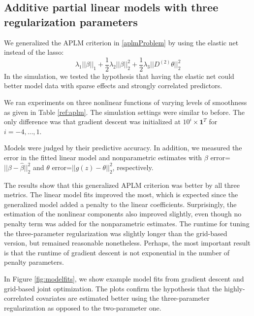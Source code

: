 \documentclass[10pt,letterpaper]{article}
\begin{document}
\subsection{Additive partial linear models with three regularization parameters}
We generalized the APLM criterion in \eqref{aplmProblem} by using the elastic net instead of the lasso:
\begin{equation}
\lambda_1 \lvert\lvert \beta \rvert \rvert_1
+ \frac{1}{2} \lambda_2 \lvert\lvert \beta \rvert \rvert_2^2
+ \frac{1}{2} \lambda_3 \lvert\lvert D^{(2)} \theta \rvert \rvert_2^2
\end{equation}
In the simulation, we tested the hypothesis that having the elastic net could better model data with sparse effects and strongly correlated predictors.

We ran experiments on three nonlinear functions of varying levels of smoothness as given in Table \ref{ref:aplm}. The simulation settings were similar to before. The only difference was that gradient descent was initialized at $10^i \times \boldsymbol 1^T$ for $i=-4, ..., 1$.

Models were judged by their predictive accuracy. In addition, we measured the error in the fitted linear model and nonparametric estimates with $\beta$ error=$||\beta - \hat \beta||_2^2$ and $\theta$ error=$|| g(z) - \theta ||_2^2$, respectively.

The results show that this generalized APLM criterion was better by all three metrics. The linear model fits improved the most, which is expected since the generalized model added a penalty to the linear coefficients. Surprisingly, the estimation of the nonlinear components also improved slightly, even though no penalty term was added for the nonparametric estimates. The runtime for tuning the three-parameter regularization was slightly longer than the grid-based version, but remained reasonable nonetheless. Perhaps, the most important result is that the runtime of gradient descent is not exponential in the number of penalty parameters.

In Figure \ref{fig:modelfits}, we show example model fits from gradient descent and grid-based joint optimization. The plots confirm the hypothesis that the highly-correlated covariates are estimated better using the three-parameter regularization as opposed to the two-parameter one.
\end{document}
